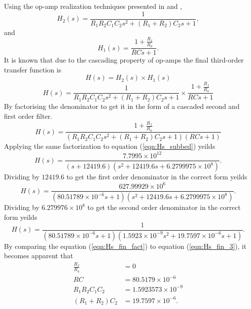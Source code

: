 \documentclass[a4paper, onecolumn, 12pt]{IEEEtran}
\begin{document}
    Using the op-amp realization techniques presented in \cite{lathi} and \cite{carlson}, 
    \begin{equation}
      H_2(s) = \frac{1}{R_1R_2C_1C_2s^2 + (R_1 + R_2)C_2s + 1},
      \label{eqn:chebyshev_2nd}
    \end{equation}
    and
    \begin{equation}
      H_1(s) = \frac{1 + \frac{R_f}{R_a}}{RCs + 1}
      \label{eqn:chebyshev_1st}.
    \end{equation}
    It is known that due to the cascading property of op-amps the final third-order transfer function is
    \begin{equation}
      \nonumber
      H(s) = H_2(s) \times H_1(s)
    \end{equation}
    \begin{equation}
      H(s) = \frac{1}{R_1R_2C_1C_2s^2 + (R_1 + R_2)C_2s + 1} \times  \frac{1 + \frac{R_f}{R_a}}{RCs + 1}
      \label{eqn:Hs_fin}
    \end{equation}
    By factorising the denominator to get it in the form of a cascaded second and first order filter.
    \begin{equation}
      H(s) = \frac{1+\frac{R_f}{R_a}}{(R_1R_2C_1C_2s^2 + (R_1 + R_2)C_2s + 1)(RCs + 1)}
      \label{eqn:Hs_fin_fact}
    \end{equation}
    Applying the same factorization to equation (\ref{eqn:Hs_subbed}) yeilds
    \begin{equation}
      H(s) = \frac{7.7995 \times 10^{12}}{(s+12419.6)(s^2 + 12419.6s + 6.2799975 \times 10^8)}.
      \label{eqn:Hs_fin_1}
    \end{equation}
    Dividing by $12419.6$ to get the first order denominator in the correct form yeilds 
    \begin{equation}
            H(s) = \frac{627.99929 \times 10^{6}}{(80.51789 \times 10^{-6}s + 1)(s^2 + 12419.6s + 6.2799975 \times 10^8)}.
      \label{eqn:Hs_fin_2}
    \end{equation}
    Dividing by $6.279976 \times 10 ^ {8}$ to get the second order denominator in the correct form yeilds 
    \begin{equation}
      H(s) = \frac{1}{(80.51789 \times 10^{-6}s + 1)(1.5923 \times 10^{-9} s^2 + 19.7597 \times 10^{-6} s + 1)}.
      \label{eqn:Hs_fin_3}
    \end{equation}
    By comparing the equation (\ref{eqn:Hs_fin_fact}) to equation (\ref{eqn:Hs_fin_3}), it becomes apparent that
    \begin{align*}
      \frac{R_f}{R_a} &= 0 \\
      RC &= 80.5179 \times 10^{-6} \\ 
      R_1R_2C_1C_2 &= 1.5923573 \times 10^{-9} \\ 
      (R_1 + R_2)C_2 &= 19.7597 \times 10^{-6} .\\
      \label{eqn:Chebyshev_RC}
    \end{align*}
\end{document}

